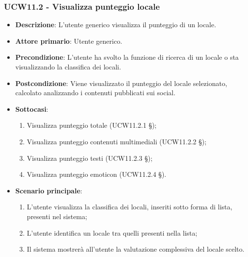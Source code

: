 \subsubsection{UCW11.2 - Visualizza punteggio locale}
\begin{itemize}
    \item \textbf{Descrizione}: L'utente generico visualizza il punteggio di un locale.
    \item \textbf{Attore primario}: Utente generico.
    \item \textbf{Precondizione}: L'utente ha svolto la funzione di ricerca di un locale o sta visualizzando la classifica dei locali.
    \item \textbf{Postcondizione}: Viene visualizzato il punteggio del locale selezionato, calcolato analizzando i contenuti pubblicati sui social.
    \item \textbf{Sottocasi}:
	\begin{enumerate}
		\item Visualizza punteggio totale (UCW11.2.1 \S{});
		\item Visualizza punteggio contenuti multimediali (UCW11.2.2 \S{});
		\item Visualizza punteggio testi (UCW11.2.3 \S{});
		\item Visualizza punteggio emoticon (UCW11.2.4 \S{}).
	\end{enumerate}
    \item \textbf{Scenario principale}: 
    \begin{enumerate}
	\item L'utente visualizza la classifica dei locali, inseriti sotto forma di lista, presenti nel sistema;    
    \item L'utente identifica un locale tra quelli presenti nella lista;
    \item Il sistema mostrerà all'utente la valutazione complessiva del locale scelto.
    \end{enumerate}
\end{itemize}

